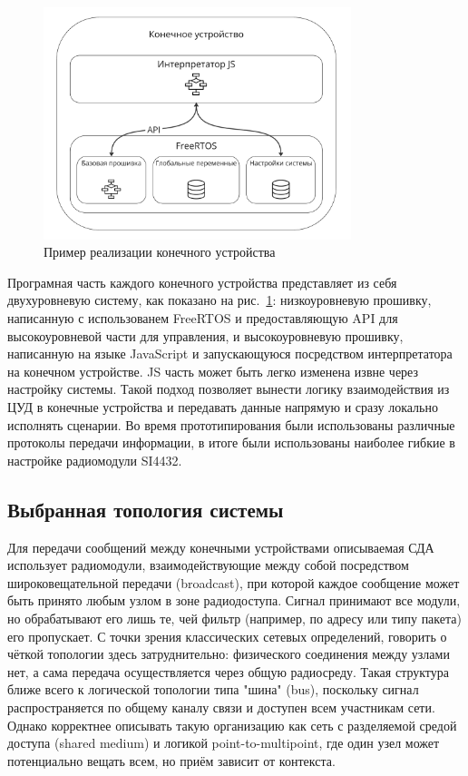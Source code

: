 \documentclass[a4paper,12pt]{article}
\begin{document}
\begin{figure}[h]
    \centering
    \includegraphics[width=0.8\textwidth]{images/Fig05.png}
    \caption{Пример реализации конечного устройства}
    \label{fig:end_device}
\end{figure}

Програмная часть каждого конечного устройства представляет из себя двухуровневую систему, как показано на рис.~\ref{fig:end_device}:
низкоуровневую прошивку, написанную с использованем FreeRTOS и предоставляющую API для высокоуровневой части для
управления, и высокоуровневую прошивку, написанную на языке JavaScript и запускающуюся посредством интерпретатора на
конечном устройстве. JS часть может быть легко изменена извне через настройку системы. Такой подход
позволяет вынести логику взаимодействия из ЦУД в конечные устройства и передавать данные напрямую и сразу локально
исполнять сценарии. Во время прототипирования были использованы различные протоколы передачи информации, в итоге
были использованы наиболее гибкие в настройке радиомодули SI4432.

\subsection{Выбранная топология системы}
Для передачи сообщений между конечными устройствами описываемая СДА использует радиомодули, взаимодействующие между собой посредством широковещательной передачи (broadcast), при которой каждое сообщение может быть принято любым узлом в зоне радиодоступа. Сигнал принимают все модули, но обрабатывают его лишь те, чей фильтр (например, по адресу или типу пакета) его пропускает. С точки зрения классических сетевых определений, говорить о чёткой топологии здесь затруднительно: физического соединения между узлами нет, а сама передача осуществляется через общую радиосреду. Такая структура ближе всего к логической топологии типа "шина" (bus), поскольку сигнал распространяется по общему каналу связи и доступен всем участникам сети. Однако корректнее описывать такую организацию как сеть с разделяемой средой доступа (shared medium) и логикой point-to-multipoint, где один узел может потенциально вещать всем, но приём зависит от контекста.
\end{document}
